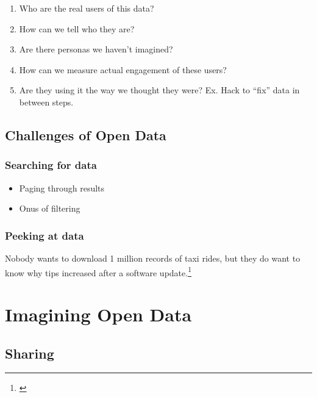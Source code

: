 \documentclass[
  openany]{book}
\providecommand{\tightlist}{%
  \setlength{\itemsep}{0pt}\setlength{\parskip}{0pt}}
\begin{document}
\begin{enumerate}
\def\labelenumi{\arabic{enumi}.}
\tightlist
\item
  Who are the real users of this data?
\item
  How can we tell who they are?
\item
  Are there personas we haven't imagined?
\item
  How can we measure actual engagement of these users?
\item
  Are they using it the way we thought they were? Ex. Hack to ``fix'' data in between steps.
\end{enumerate}

\hypertarget{challenges-of-open-data}{%
\section{Challenges of Open Data}\label{challenges-of-open-data}}

\hypertarget{searching-for-data}{%
\subsection{Searching for data}\label{searching-for-data}}

\begin{itemize}
\tightlist
\item
  Paging through results
\item
  Onus of filtering
\end{itemize}

\hypertarget{peeking-at-data}{%
\subsection{Peeking at data}\label{peeking-at-data}}

Nobody wants to download 1 million records of taxi rides, but they do want to know why tips increased after a software update.\footnote{\citet{iquantny2020}}

\hypertarget{imagine}{%
\chapter{Imagining Open Data}\label{imagine}}

\hypertarget{sharing}{%
\section{Sharing}\label{sharing}}
\end{document}
